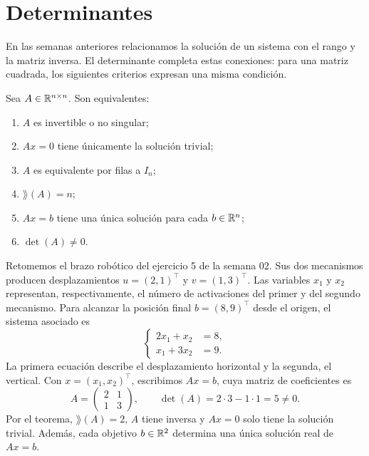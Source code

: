 \documentclass[compacto,10pt]{pubciencias-notas}
\begin{document}
\encabezado
\vspace*{-8mm}
\setcounter{section}{2}
\section{Determinantes}
\setcounter{subsection}{3}

En las semanas anteriores relacionamos la solución de un sistema con el rango
y la matriz inversa. El determinante completa estas conexiones: para una matriz
cuadrada, los siguientes criterios expresan una misma condición.

\begin{teo}\label{sem05cl01:equivalencias}
    Sea $A\in\Mat[\R]{n}{n}$. Son equivalentes:
    \begin{enumerate}
        \item $A$ es invertible o no singular;
        \item $Ax=0$ tiene únicamente la solución trivial;
        \item $A$ es equivalente por filas a $I_n$;
        \item $\rang(A)=n$;
        \item $Ax=b$ tiene una única solución para cada $b\in\R^n$;
        \item $\det(A)\ne0$.
    \end{enumerate}
\end{teo}

\begin{ejem}\label{sem05cl01:robot-modelo}
    Retomemos el brazo robótico del ejercicio 5 de la semana 02. Sus dos mecanismos producen
    desplazamientos $u=(2,1)^{\top}$ y $v=(1,3)^{\top}$.
    Las variables $x_1$ y $x_2$ representan, respectivamente, el número de
    activaciones del primer y del segundo mecanismo. Para alcanzar la posición final $b=(8,9)^{\top}$ desde el origen, el sistema asociado es
    \[
        \left\{\begin{aligned}
            2x_1+x_2&=8,\\
            x_1+3x_2&=9.
        \end{aligned}\right.
    \]
    La primera ecuación describe el desplazamiento horizontal y la segunda,
    el vertical. Con $x=(x_1,x_2)^{\top}$, escribimos $Ax=b$, cuya matriz
    de coeficientes es
    \[
        A=\begin{pmatrix}2&1\\1&3\end{pmatrix},
        \qquad \det(A)=2\cdot3-1\cdot1=5\ne0.
    \]
    Por el teorema, $\rang(A)=2$, $A$ tiene inversa y $Ax=0$ solo tiene la
    solución trivial. Además, cada objetivo $b\in\R^2$ determina una única
    solución real de $Ax=b$.
\end{ejem}
\end{document}
